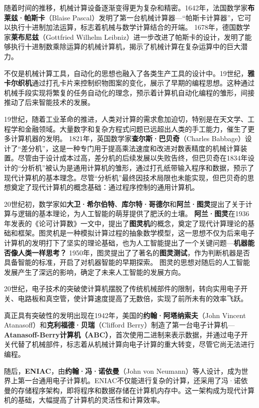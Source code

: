随着时间的推移，机械计算设备逐渐变得更为复杂和精密。1642年，法国数学家{\bf 布莱兹·帕斯卡}（Blaise Pascal）发明了第一台机械计算器---“帕斯卡计算器”，它可以执行十进制加法运算，标志着机械与数学计算结合的开端。
1678年，德国数学家{\bf 莱布尼兹}（Gottfried Wilhelm Leibniz）进一步改进了帕斯卡的设计，发明了能够执行十进制数乘除运算的机械计算机，揭示了机械计算在复杂运算中的巨大潜力。

不仅是机械计算工具，自动化的思想也融入了各类生产工具的设计中。19世纪，{\bf 雅卡尔织机}通过打孔卡片来控制织物图案的变化，展示了早期的编程思想。这种通过机械手段实现将繁复的任务自动化的理念，预示着计算机自动化编程的雏形，间接推动了后来智能技术的发展。

19世纪，随着工业革命的推进，人类对计算的需求愈加迫切，特别是在天文学、工程学和金融领域。大量数字和复杂方程式问题已远超出人类的手工能力，催生了更多计算机器的发明。
1821年，英国数学家{\bf 查尔斯·巴贝奇}（Charles Babbage）设计了“差分机”，这是一种专门用于提高乘法速度和改进对数表精度的机械计算装置。尽管由于设计成本过高，差分机的后续发展以失败告终，但巴贝奇在1834年设计的“分析机”被认为是通用计算机的雏形，通过打孔纸带输入程序和数据，预示了现代计算机的基本理念。尽管“分析机”最终因技术局限也未能实现，但巴贝奇的思想奠定了现代计算机的概念基础：通过程序控制的通用计算机。

20世纪初，数学家如{\bf 大卫·希尔伯特}、{\bf 库尔特·哥德尔}和{\bf 阿兰·图灵}提出了关于计算与逻辑的基本理论，为人工智能的萌芽提供了肥沃的土壤。
{\bf 阿兰·图灵}在1936年发表的《论可计算数》一文中，提出了{\bf 图灵机}的概念，奠定了现代计算理论的基础和框架。图灵机是一种模拟计算过程的抽象数学模型，这一思想不仅为后来电子计算机的发明打下了坚实的理论基础，也为人工智能提出了一个关键问题---{\bf 机器能否像人类一样思考？} 1950年，图灵提出了了著名的{\bf 图灵测试}，作为判断机器是否具备智能的标准，开启了对机器智能的早期探索。
图灵的思想对随后的人工智能发展产生了深远的影响，确定了未来人工智能的发展方向。

20世纪，电子技术的突破使计算机摆脱了传统机械部件的限制，转向实用电子开关、电路板和真空管，使计算速度提高了无数倍，实现了前所未有的效率飞跃。

真正具有突破性的发明出现在1942年，美国的{\bf 约翰·阿塔纳索夫}（John Vincent Atanasoff）和{\bf 克利福德·贝瑞}（Clifford Berry）制造了第一台电子计算机---{\bf Atanasoff-Berry计算机（ABC）}，首次使用二进制来表示数据，并通过电子开关代替了机械部件，标志着从机械计算向电子计算的重大转变，尽管它尚无法进行编程。

随后，{\bf ENIAC}，由{\bf 约翰·冯·诺依曼}（John von Neumann）等人设计，成为世界上第一台通用电子计算机。ENIAC不仅能进行复杂的计算，还采用了冯·诺依曼的存储程序架构，即将程序和数据存储在计算机内存中。这一架构成为现代计算机的基础，大幅提高了计算机的灵活性和计算效率。

